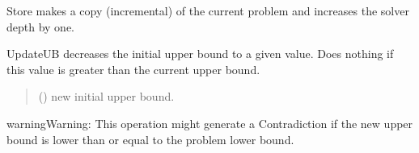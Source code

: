 \documentclass[letterpaper,10pt,openany,oneside,english]{sphinxmanual}
\begin{document}
\begin{fulllineitems}
\begin{fulllineitems}
\begin{quote}
\begin{description}
\end{description}\end{quote}

\end{fulllineitems}


\begin{fulllineitems}
\label{\detokenize{ref/ref_python:pytoulbar2.CFN.Store}}
\pysigstartsignatures
{}
\pysigstopsignatures
\sphinxAtStartPar
Store makes a copy (incremental) of the current problem and increases the solver depth by one.

\end{fulllineitems}


\begin{fulllineitems}
\label{\detokenize{ref/ref_python:pytoulbar2.CFN.UpdateUB}}
\pysigstartsignatures
{}
\pysigstopsignatures
\sphinxAtStartPar
UpdateUB decreases the initial upper bound to a given value. Does nothing if this value is greater than the current upper bound.
\begin{quote}\begin{description}
\sphinxAtStartPar
{} () \textendash{} new initial upper bound.

\end{description}\end{quote}

\begin{sphinxadmonition}{warning}{Warning:}
\sphinxAtStartPar
This operation might generate a Contradiction if the new upper bound is lower than or equal to the problem lower bound.
\end{sphinxadmonition}

\end{fulllineitems}


\begin{fulllineitems}
\label{\detokenize{ref/ref_python:pytoulbar2.CFN.flatten}}
\pysigstartsignatures
{}
\pysigstopsignatures
\end{fulllineitems}


\end{fulllineitems}
\end{document}
